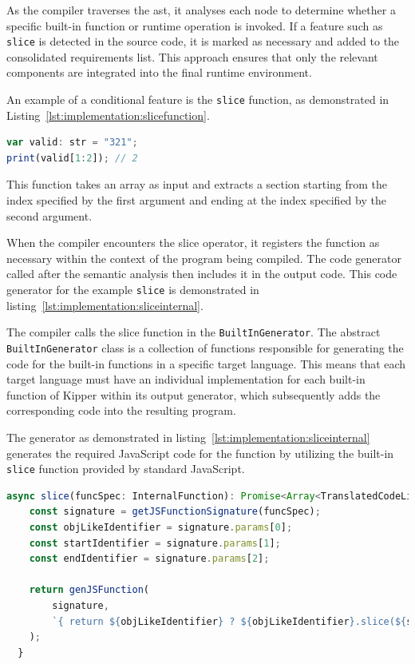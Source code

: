 As the compiler traverses the \acrshort{ast}, it analyses each node to determine whether a specific built-in function or runtime operation is invoked. If a feature such as \lstinline|slice| is detected in the source code, it is marked as necessary and added to the consolidated requirements list. This approach ensures that only the relevant components are integrated into the final runtime environment.

An example of a conditional feature is the \lstinline|slice| function, as demonstrated in Listing~\ref{lst:implementation:slicefunction}.

\begin{lstlisting}[language=TypeScript,caption=The Slice Operation,label=lst:implementation:slicefunction]
var valid: str = "321";
print(valid[1:2]); // 2
\end{lstlisting}

This function takes an array as input and extracts a section starting from the index specified by the first argument and ending at the index specified by the second argument.

When the compiler encounters the slice operator, it registers the function as necessary within the context of the program being compiled. The code generator called after the semantic analysis then includes it in the output code. This code generator for the example \lstinline|slice| is demonstrated in listing~\ref{lst:implementation:sliceinternal}.

The compiler calls the slice function in the \lstinline|BuiltInGenerator|. The abstract \lstinline|BuiltInGenerator| class is a collection of functions responsible for generating the code for the built-in functions in a specific target language. This means that each target language must have an individual implementation for each built-in function of Kipper within its output generator, which subsequently adds the corresponding code into the resulting program.

The generator as demonstrated in listing~\ref{lst:implementation:sliceinternal} generates the required JavaScript code for the function by utilizing the built-in \lstinline|slice| function provided by standard JavaScript.

\begin{lstlisting}[language=TypeScript,caption=Slice in the JavaScript BuiltInGenerator,label=lst:implementation:sliceinternal]
async slice(funcSpec: InternalFunction): Promise<Array<TranslatedCodeLine>> {
	const signature = getJSFunctionSignature(funcSpec);
	const objLikeIdentifier = signature.params[0];
	const startIdentifier = signature.params[1];
	const endIdentifier = signature.params[2];

	return genJSFunction(
		signature,
		`{ return ${objLikeIdentifier} ? ${objLikeIdentifier}.slice(${startIdentifier}, ${endIdentifier}) : ${objLikeIdentifier}; }`,
	);
  }
\end{lstlisting}

